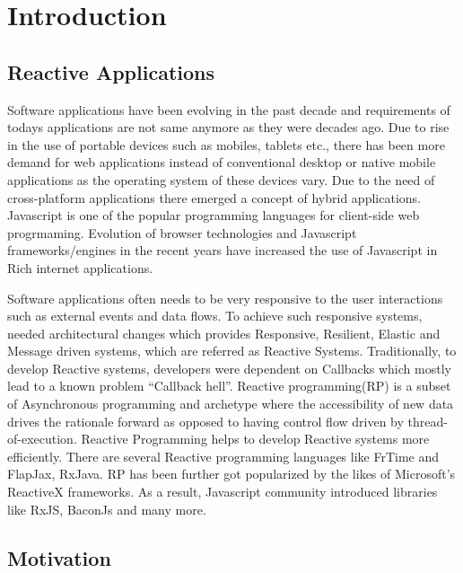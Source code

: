 \chapter{Introduction} \label{chap:Introduction}

\section{Reactive Applications}
Software applications have been evolving in the past decade and requirements of today\textquotesingle s applications are not same anymore as they were decades ago\cite{reactiveManifesto}. 
Due to rise in the use of portable devices such as mobiles, tablets etc., there has been more demand for web applications instead of conventional desktop or native mobile applications as the operating system of these devices vary\cite{7818919}. 
Due to the need of cross-platform applications there emerged a concept of hybrid applications. Javascript is one of the popular programming languages for client-side web progrmaming. Evolution of browser technologies and Javascript frameworks/engines in the recent years have increased the use of Javascript in Rich internet applications\cite{6068340}\cite{Sen:2013:JSR:2491411.2491447}. 

Software applications often needs to be very responsive to the user interactions such as external events and data flows. 
To achieve such responsive systems, needed architectural changes which provides Responsive, Resilient, Elastic and Message driven systems, which are referred as Reactive Systems\cite{reactiveManifesto}. Traditionally, to develop Reactive systems, developers were dependent on Callbacks which mostly lead to a known problem ``Callback hell''. 
Reactive programming(RP) is a subset of Asynchronous programming and archetype where the accessibility of new data drives the rationale forward as opposed to having control flow driven by thread-of-execution. 
Reactive Programming helps to develop Reactive systems more efficiently. 
There are several Reactive programming languages like FrTime\cite{Cooper2006} and FlapJax\cite{Meyerovich:2009:FPL:1639949.1640091}, RxJava\cite{rxJava}. RP has been further got popularized by the likes of Microsoft's ReactiveX frameworks\cite{reactiveX}.  As a result, Javascript community introduced libraries like RxJS\cite{rxjs}, BaconJs\cite{baconjs} and many more.


\section{Motivation}

